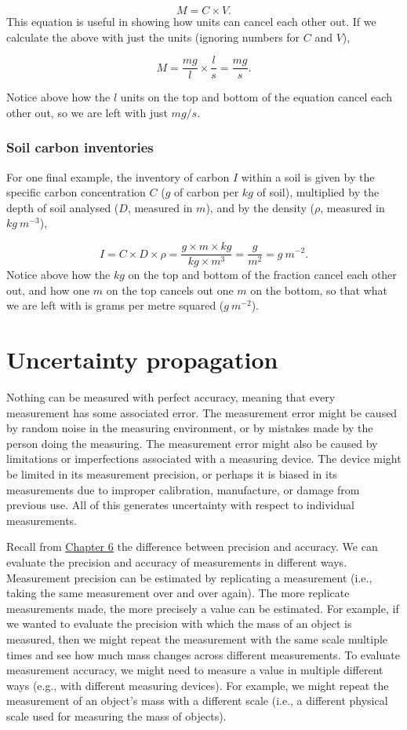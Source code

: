 \documentclass[
]{scrbook}
\begin{document}
\[M = C \times V.\]
This equation is useful in showing how units can cancel each other out.
If we calculate the above with just the units (ignoring numbers for \(C\) and \(V\)),

\[M = \frac{mg}{l} \times \frac{l}{s} = \frac{mg}{s}.\]

Notice above how the \(l\) units on the top and bottom of the equation cancel each other out, so we are left with just \(mg/s\).

\hypertarget{soil-carbon-inventories}{%
\subsection{Soil carbon inventories}\label{soil-carbon-inventories}}

For one final example, the inventory of carbon \(I\) within a soil is given by the specific carbon concentration \(C\) (\(g\) of carbon per \(kg\) of soil), multiplied by the depth of soil analysed (\(D\), measured in \(m\)), and by the density (\(\rho\), measured in \(kg\:m^{-3}\)),

\[I = C \times D \times \rho = \frac{g\times m \times kg}{kg \times m^{3}} = \frac{g}{m^{2}} = g\:m^{-2}.\]
Notice above how the \(kg\) on the top and bottom of the fraction cancel each other out, and how one \(m\) on the top cancels out one \(m\) on the bottom, so that what we are left with is grams per metre squared (\(g\:m^{-2}\)).

\hypertarget{Chapter_7}{%
\chapter{Uncertainty propagation}\label{Chapter_7}}

Nothing can be measured with perfect accuracy, meaning that every measurement has some associated error.
The measurement error might be caused by random noise in the measuring environment, or by mistakes made by the person doing the measuring.
The measurement error might also be caused by limitations or imperfections associated with a measuring device.
The device might be limited in its measurement precision, or perhaps it is biased in its measurements due to improper calibration, manufacture, or damage from previous use.
All of this generates uncertainty with respect to individual measurements.

Recall from \protect\hyperlink{Chapter_6}{Chapter 6} the difference between precision and accuracy.
We can evaluate the precision and accuracy of measurements in different ways.
Measurement precision can be estimated by replicating a measurement (i.e., taking the same measurement over and over again).
The more replicate measurements made, the more precisely a value can be estimated.
For example, if we wanted to evaluate the precision with which the mass of an object is measured, then we might repeat the measurement with the same scale multiple times and see how much mass changes across different measurements.
To evaluate measurement accuracy, we might need to measure a value in multiple different ways (e.g., with different measuring devices).
For example, we might repeat the measurement of an object's mass with a different scale (i.e., a different physical scale used for measuring the mass of objects).
\end{document}
